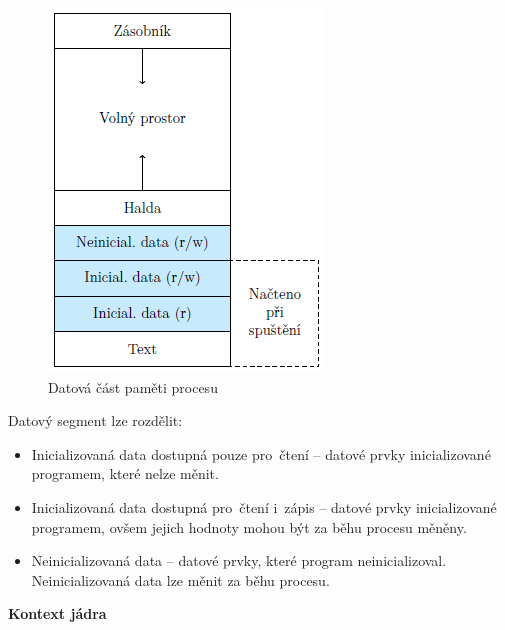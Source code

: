 \begin{figure}[H]
\begin{minipage}[b]{0.4\textwidth}
    \includegraphics[width=\textwidth]{images/proc_data_segment.png}
    \caption{Datová část paměti procesu}
  \end{minipage}
\end{figure}

Datový segment lze rozdělit:

\begin{itemize}
    \item  Inicializovaná data dostupná pouze pro~čtení – datové prvky inicializované programem,
    které nelze měnit.
    \item Inicializovaná data dostupná pro~čtení i~zápis – datové prvky inicializované programem,
    ovšem jejich hodnoty mohou být za běhu procesu měněny.
    \item Neinicializovaná data – datové prvky, které program neinicializoval. Neinicializovaná
    data lze měnit za běhu procesu.
\end{itemize}

\begin{Large}
    \vspace{0,5cm}
    \textbf{Kontext jádra}
\end{Large}


